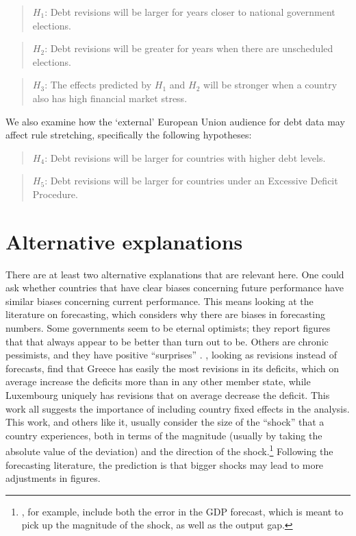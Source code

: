 \documentclass[]{article}
\begin{document}
\begin{quote}
    $H_{1}$: Debt revisions will be larger for years closer to national government elections.
\end{quote}

\begin{quote}
    $H_{2}$: Debt revisions will be greater for years when there are unscheduled elections.
\end{quote}

\begin{quote}
    $H_{3}$: The effects predicted by $H_{1}$ and $H_{2}$ will be stronger when a country also has high financial market stress.
\end{quote}

We also examine how the `external' European Union audience for debt data may affect rule stretching, specifically the following hypotheses:

\begin{quote}
    $H_{4}$: Debt revisions will be larger for countries with higher debt levels.
\end{quote}

\begin{quote}
    $H_{5}$: Debt revisions will be larger for countries under an Excessive Deficit Procedure.
\end{quote}


\section{Alternative explanations}

There are at least two alternative explanations that are relevant here. One could ask whether countries that have clear biases concerning future performance have similar biases concerning current performance. This means looking at the literature on forecasting, which  considers why there are biases in forecasting numbers. Some governments seem to be eternal optimists; they report figures that that always appear to be better than turn out to be. Others are chronic pessimists, and they have positive ``surprises'' \citep[e.g.][]{Strauchetal2004}. \cite{DeCastro2013}, looking as revisions instead of forecasts, find that Greece has easily the most revisions in its deficits, which on average increase the deficits more than in any other member state, while Luxembourg uniquely has revisions that on average decrease the deficit. This work all suggests the importance of including country fixed effects in the analysis.  This work, and others like it, usually consider the size of the ``shock'' that a country experiences, both in terms of the magnitude (usually by taking the absolute value of the deviation) and the direction of the shock.\footnote{\cite{PinaVenes2011}, for example, include both the error in the GDP forecast, which is meant to pick up the magnitude of the shock, as well as the output gap.}  Following the forecasting literature, the prediction is that bigger shocks may lead to more adjustments in figures.  
\end{document}
